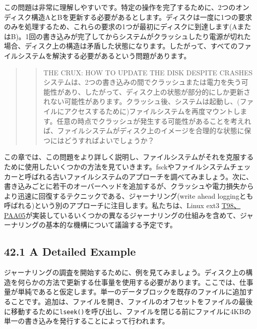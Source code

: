 この問題は非常に理解しやすいです。特定の操作を完了するために、2つのオンディスク構造AとBを更新する必要があるとします。ディスクは一度に1つの要求のみを処理するため、これらの要求の1つが最初にディスクに到達します(AまたはB)。1回の書き込みが完了してからシステムがクラッシュしたり電源が切れた場合、ディスク上の構造は矛盾した状態になります。したがって、すべてのファイルシステムを解決する必要があるという問題があります。

\begin{quote}
\begin{quote}
THE CRUX: HOW TO UPDATE THE DISK DESPITE CRASHES\\
システムは、2つの書き込みの間でクラッシュまたは電力を失う可能性があり、したがって、ディスク上の状態が部分的にしか更新されない可能性があります。クラッシュ後、システムは起動し、(ファイルにアクセスするために)ファイルシステムを再度マウントします。任意の時点でクラッシュが発生する可能性があることを考えれば、ファイルシステムがディスク上のイメージを合理的な状態に保つにはどうすればよいでしょうか？
\end{quote}
\end{quote}

この章では、この問題をより詳しく説明し、ファイルシステムがそれを克服するために使用したいくつかの方法を見ていきます。fsckやファイルシステムチェッカーと呼ばれる古いファイルシステムのアプローチを調べてみましょう。次に、書き込みごとに若干のオーバーヘッドを追加するが、クラッシュや電力損失からより迅速に回復するテクニックである、ジャーナリング(write
ahead
loggingとも呼ばれる)という別のアプローチに注目します。私たちは、Linux
ext3
\href{比較的近代的なジャーナリングファイルシステム}{T98、PAA05}が実装しているいくつかの異なるジャーナリングの仕組みを含めて、ジャーナリングの基本的な機構について議論する予定です。

\hypertarget{a-detailed-example}{%
\subsection*{42.1 A Detailed Example}\label{a-detailed-example}}

ジャーナリングの調査を開始するために、例を見てみましょう。ディスク上の構造を何らかの方法で更新する仕事量を使用する必要があります。ここでは、仕事量が単純であると仮定します。単一のデータブロックを既存のファイルに追加することです。追加は、ファイルを開き、ファイルのオフセットをファイルの最後に移動するために\texttt{lseek()}を呼び出し、ファイルを閉じる前にファイルに4KBの単一の書き込みを発行することによって行われます。


